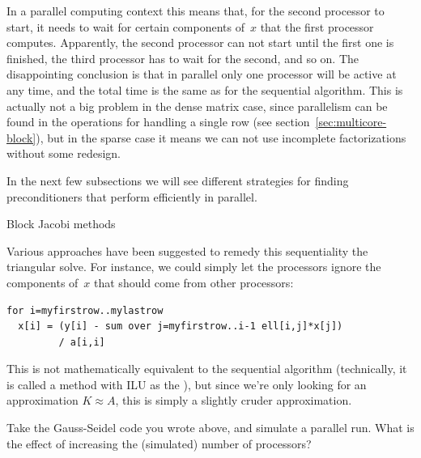 In a parallel computing context this means that, for the second
processor to start, it needs to wait for certain components of~$x$
that the first processor computes. Apparently, the second processor
can not start until the first one is finished, the third processor has
to wait for the second, and so on. The disappointing conclusion is
that in parallel only one processor will be active at any time, and
the total time is the same as for the sequential algorithm. This is
actually not a big problem in the dense matrix case, since parallelism
can be found in the operations for handling a single row (see
section~\ref{sec:multicore-block}), but in the sparse case it means we
can not use incomplete factorizations without some redesign.

In the next few subsections we will see different strategies for
finding preconditioners that perform efficiently in parallel.

 {Block Jacobi methods}
\label{sec:block-jacobi}

Various approaches have been suggested to remedy this sequentiality
the triangular solve. For instance, we could simply let the processors
ignore the components of~$x$ that should come from other processors:
\begin{verbatim}
for i=myfirstrow..mylastrow
  x[i] = (y[i] - sum over j=myfirstrow..i-1 ell[i,j]*x[j]) 
         / a[i,i]
\end{verbatim}
This is not mathematically equivalent to the sequential algorithm
(technically, it is called a  method with 
\ac{ILU} as the ), but
since we're only looking for an approximation $K\approx A$, this is
simply a slightly cruder approximation.
\begin{exercise}
  Take the Gauss-Seidel code you wrote above, and simulate a parallel
  run. What is the effect of increasing the (simulated) number of processors?
\end{exercise}

